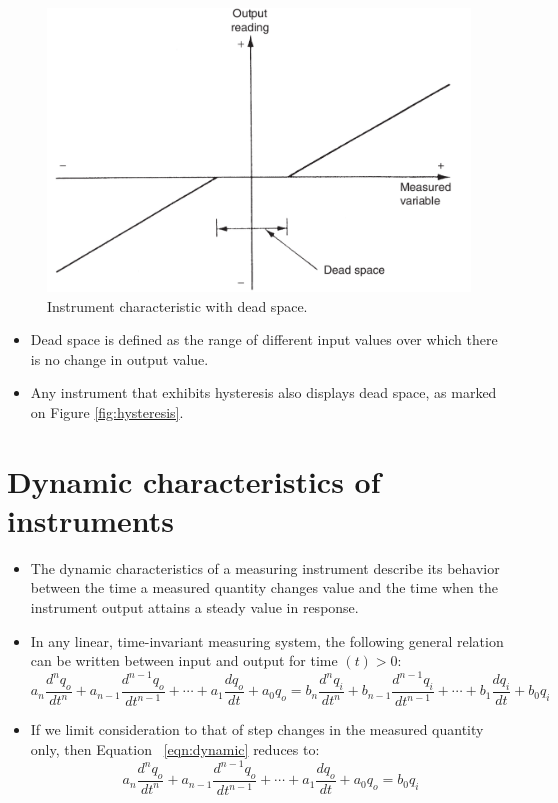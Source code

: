 \documentclass[a4paper,11pt,dvipsnames]{book}
\begin{document}
\begin{figure}[h!]\label{fig:deadspace}
\centering
  \includegraphics[width=0.7\linewidth]{deadspace}
  \caption{Instrument characteristic with dead space.} 
\end{figure}

\begin{itemize}
\item Dead space is defined as the range of different input values over which there is no change in
output value.
\item Any instrument that exhibits hysteresis also displays dead space, as marked on Figure \ref{fig:hysteresis}.

\end{itemize}


\section*{Dynamic characteristics of instruments}

\begin{itemize}
\item The dynamic characteristics of a measuring instrument describe its behavior between the time a
measured quantity changes value and the time when the instrument output attains a steady value in
response.
\item In any linear, time-invariant measuring system, the following general relation can be written
between input and output for time $(t)>0$: 
\begin{equation}\label{eqn:dynamic}
a_n \frac{d^{n}q_o}{dt^{n}} + a_{n-1} \frac{d^{n-1}q_o}{dt^{n-1}} + \cdots + a_1 \frac{dq_o}{dt} + a_0 q_o =  b_n \frac{d^{n}q_i}{dt^{n}} + b_{n-1} \frac{d^{n-1}q_i}{dt^{n-1}} + \cdots + b_1 \frac{dq_i}{dt} + b_0 q_i 
\end{equation}
\item If we limit consideration to that of step changes in the measured quantity only, then Equation ~\ref{eqn:dynamic} reduces to:
\begin{equation}\label{eqn:dynamic-reduced}
a_n \frac{d^{n}q_o}{dt^{n}} + a_{n-1} \frac{d^{n-1}q_o}{dt^{n-1}} + \cdots + a_1 \frac{dq_o}{dt} + a_0 q_o =   b_0 q_i 
\end{equation}
\end{itemize}
\end{document}

